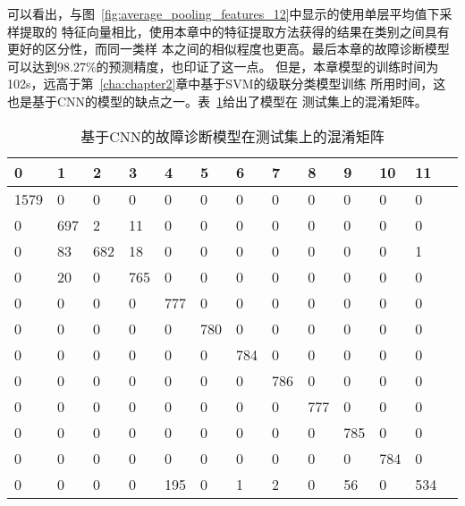 可以看出，与图~\ref{fig:average_pooling_features_12}中显示的使用单层平均值下采样提取的
特征向量相比，使用本章中的特征提取方法获得的结果在类别之间具有更好的区分性，而同一类样
本之间的相似程度也更高。最后本章的故障诊断模型可以达到98.27\%的预测精度，也印证了这一点。
但是，本章模型的训练时间为102s，远高于第~\ref{cha:chapter2}章中基于SVM的级联分类模型训练
所用时间，这也是基于CNN的模型的缺点之一。表~\ref{tab:chap3:confusion_matrix}给出了模型在
测试集上的混淆矩阵。
\begin{table}[htb]
  \centering
  \begin{minipage}[t]{0.9\linewidth} %
  \caption{基于CNN的故障诊断模型在测试集上的混淆矩阵}
  \label{tab:chap3:confusion_matrix}
    \begin{tabularx}{\linewidth}{l|XXXXXXXXXXXX}
      \toprule[1.5pt]
         0 &   1 &   2 &   3 &   4 &   5 &   6 &   7 &   8 &   9 &  10 &  11 \\\midrule[1pt]
      1579 &   0 &   0 &   0 &   0 &   0 &   0 &   0 &   0 &   0 &   0 &   0 \\
         0 & 697 &   2 &  11 &   0 &   0 &   0 &   0 &   0 &   0 &   0 &   0 \\
         0 &  83 & 682 &  18 &   0 &   0 &   0 &   0 &   0 &   0 &   0 &   1 \\
         0 &  20 &   0 & 765 &   0 &   0 &   0 &   0 &   0 &   0 &   0 &   0 \\
         0 &   0 &   0 &   0 & 777 &   0 &   0 &   0 &   0 &   0 &   0 &   0 \\
         0 &   0 &   0 &   0 &   0 & 780 &   0 &   0 &   0 &   0 &   0 &   0 \\
         0 &   0 &   0 &   0 &   0 &   0 & 784 &   0 &   0 &   0 &   0 &   0 \\
         0 &   0 &   0 &   0 &   0 &   0 &   0 & 786 &   0 &   0 &   0 &   0 \\
         0 &   0 &   0 &   0 &   0 &   0 &   0 &   0 & 777 &   0 &   0 &   0 \\
         0 &   0 &   0 &   0 &   0 &   0 &   0 &   0 &   0 & 785 &   0 &   0 \\
         0 &   0 &   0 &   0 &   0 &   0 &   0 &   0 &   0 &   0 & 784 &   0 \\
         0 &   0 &   0 &   0 & 195 &   0 &   1 &   2 &   0 &  56 &   0 & 534 \\
      \bottomrule[1.5pt]
    \end{tabularx}
  \end{minipage}
\end{table}

